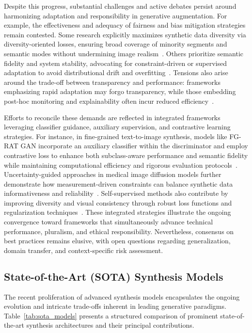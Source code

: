 \documentclass[sigconf]{acmart}
\begin{document}
Despite this progress, substantial challenges and active debates persist around harmonizing adaptation and responsibility in generative augmentation. For example, the effectiveness and adequacy of fairness and bias mitigation strategies remain contested. Some research explicitly maximizes synthetic data diversity via diversity-oriented losses, ensuring broad coverage of minority segments and semantic modes without undermining image realism~\cite{ref93}. Others prioritize semantic fidelity and system stability, advocating for constraint-driven or supervised adaptation to avoid distributional drift and overfitting~\cite{ref91,ref95}. Tensions also arise around the trade-off between transparency and performance: frameworks emphasizing rapid adaptation may forgo transparency, while those embedding post-hoc monitoring and explainability often incur reduced efficiency~\cite{ref94,ref101}.

Efforts to reconcile these demands are reflected in integrated frameworks leveraging classifier guidance, auxiliary supervision, and contrastive learning strategies. For instance, in fine-grained text-to-image synthesis, models like FG-RAT GAN incorporate an auxiliary classifier within the discriminator and employ contrastive loss to enhance both subclass-aware performance and semantic fidelity while maintaining computational efficiency and rigorous evaluation protocols~\cite{ref101}. Uncertainty-guided approaches in medical image diffusion models further demonstrate how measurement-driven constraints can balance synthetic data informativeness and reliability~\cite{ref91}. Self-supervised methods also contribute by improving diversity and visual consistency through robust loss functions and regularization techniques~\cite{ref95}. These integrated strategies illustrate the ongoing convergence toward frameworks that simultaneously advance technical performance, pluralism, and ethical responsibility. Nevertheless, consensus on best practices remains elusive, with open questions regarding generalization, domain transfer, and context-specific risk assessment.

\subsection{State-of-the-Art (SOTA) Synthesis Models}

The recent proliferation of advanced synthesis models encapsulates the ongoing evolution and intricate trade-offs inherent in leading generative paradigms. Table~\ref{tab:sota_models} presents a structured comparison of prominent state-of-the-art synthesis architectures and their principal contributions.
\end{document}
